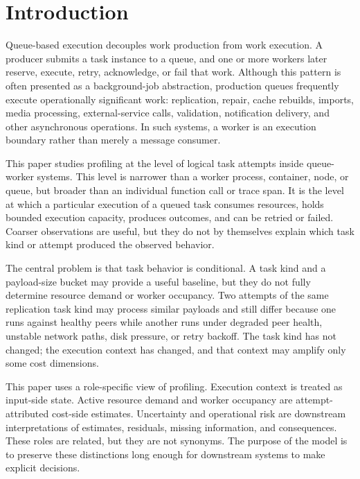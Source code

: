 \section{Introduction}
\label{sec:introduction}

Queue-based execution decouples work production from work execution. A producer
submits a task instance to a queue, and one or more workers later reserve,
execute, retry, acknowledge, or fail that work. Although this pattern is often
presented as a background-job abstraction, production queues frequently execute
operationally significant work: replication, repair, cache rebuilds, imports,
media processing, external-service calls, validation, notification delivery, and
other asynchronous operations. In such systems, a worker is an execution boundary
rather than merely a message consumer.

This paper studies profiling at the level of logical task attempts inside
queue-worker systems. This level is narrower than a worker process, container,
node, or queue, but broader than an individual function call or trace span. It is
the level at which a particular execution of a queued task consumes resources,
holds bounded execution capacity, produces outcomes, and can be retried or
failed. Coarser observations are useful, but they do not by themselves explain
which task kind or attempt produced the observed behavior.

The central problem is that task behavior is conditional. A task kind and a
payload-size bucket may provide a useful baseline, but they do not fully
determine resource demand or worker occupancy. Two attempts of the same
replication task kind may process similar payloads and still differ because one
runs against healthy peers while another runs under degraded peer health,
unstable network paths, disk pressure, or retry backoff. The task kind has not
changed; the execution context has changed, and that context may amplify only
some cost dimensions.

This paper uses a role-specific view of profiling. Execution context is treated
as input-side state. Active resource demand and worker occupancy are
attempt-attributed cost-side estimates. Uncertainty and operational risk are
downstream interpretations of estimates, residuals, missing information, and
consequences. These roles are related, but they are not synonyms. The purpose of
the model is to preserve these distinctions long enough for downstream systems
to make explicit decisions.

